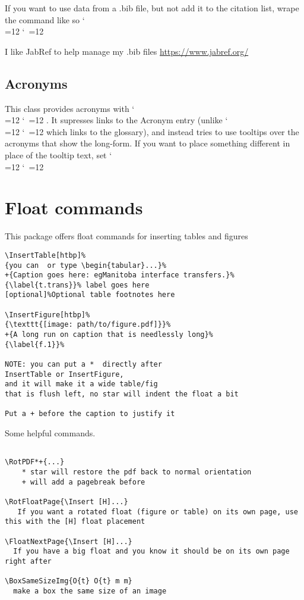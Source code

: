 \documentclass{\FormatDir corpboreportMulti}
\def\cmd{\bgroup\catcode`\\=12 \catcode`\ =12 \cmdA}
\def\cmdA#1{\egroup{\texttt{\detokenize{#1}}}}
\begin{document}
If you want to use data from a .bib file, but not add it to the citation list, wrape the command like so
\cmd{\begin{refsection}\fullcite{#1}\end{refsection}}

I like JabRef to help manage my .bib files \url{https://www.jabref.org/}


\subsection{Acronyms}

This class provides acronyms with \cmd{\ac}. It supresses links to the Acronym entry
(unlike \cmd{\gls{}} which links to the glossary), and instead
tries to use tooltips over the acronyms that show the long-form.
If you want to place something different in place of the tooltip text, set
\cmd{\def\ackeyToolTipText{Text Shown On Tooltip For: ackey}}



\section{Float commands}

This package offers float commands for inserting tables and figures

\begin{lstlisting}
\InsertTable[htbp]%
{you can  or type \begin{tabular}...}%
+{Caption goes here: egManitoba interface transfers.}%
{\label{t.trans}}% label goes here
[optional]%Optional table footnotes here

\InsertFigure[htbp]%
{\texttt{[image: path/to/figure.pdf]}}%
+{A long run on caption that is needlessly long}%
{\label{f.1}}%

NOTE: you can put a *  directly after
InsertTable or InsertFigure,
and it will make it a wide table/fig
that is flush left, no star will indent the float a bit

Put a + before the caption to justify it
\end{lstlisting}


Some helpful commands.

\begin{lstlisting}

\RotPDF*+{...}
	* star will restore the pdf back to normal orientation
	+ will add a pagebreak before

\RotFloatPage{\Insert [H]...}
   If you want a rotated float (figure or table) on its own page, use this with the [H] float placement

\FloatNextPage{\Insert [H]...}
  If you have a big float and you know it should be on its own page right after

\BoxSameSizeImg{O{t} O{t} m m}
  make a box the same size of an image
\end{lstlisting}
\end{document}
